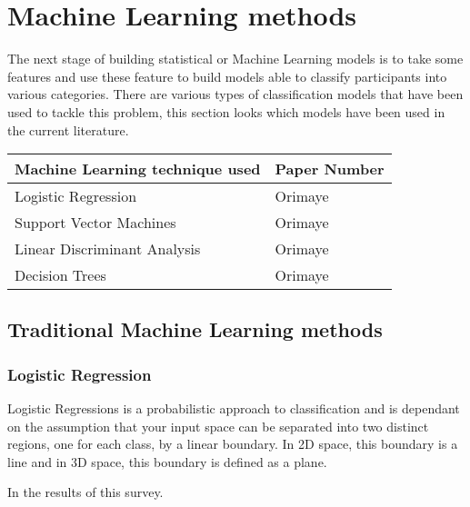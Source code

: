 \documentclass[12pt]{article}
\begin{document}
\section{Machine Learning methods}
The next stage of building statistical or Machine Learning models is to take some features and use these feature to build models able to classify participants into various categories. There are various types of classification models that have been used to tackle this problem, this section looks which models have been used in the current literature.

\begin{table}[H]
	\begin{center}
	\begin{tabular}{ p{6cm} | p{6cm} }
	\hline
	Machine Learning technique used & Paper Number \\ \hline
	Logistic Regression & Orimaye \\ \hline
	Support Vector Machines & Orimaye \\ \hline
	Linear Discriminant Analysis & Orimaye \\ \hline
	Decision Trees & Orimaye \\ \hline	
	\hline 
	\end{tabular}
	\end{center}
\end{table}

\subsection{Traditional Machine Learning methods}
\subsubsection{Logistic Regression}
Logistic Regressions is a probabilistic approach to classification and is dependant on the assumption that your input space can be separated into two distinct regions, one for each class, by a linear boundary. In 2D space, this boundary is a line and in 3D space, this boundary is defined as a plane. 
\par 
In the results of this survey.
\end{document}
